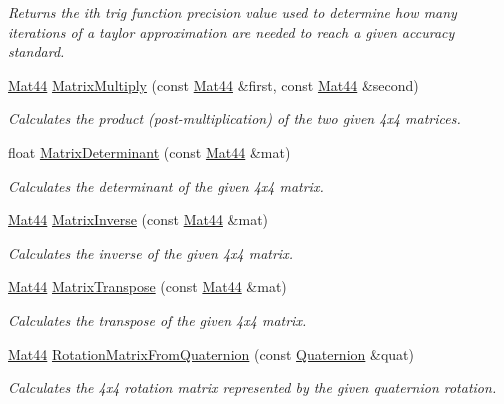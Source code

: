 \begin{DoxyCompactItemize}
\begin{DoxyCompactList}\small\item\em Returns the ith trig function precision value used to determine how many iterations of a taylor approximation are needed to reach a given accuracy standard. \end{DoxyCompactList}\item 
\hyperlink{classgofxmath_1_1_mat44}{Mat44} \hyperlink{namespacegofxmath_a4439d3f4590c372ada775196d1576f81}{Matrix\+Multiply} (const \hyperlink{classgofxmath_1_1_mat44}{Mat44} \&first, const \hyperlink{classgofxmath_1_1_mat44}{Mat44} \&second)
\begin{DoxyCompactList}\small\item\em Calculates the product (post-\/multiplication) of the two given 4x4 matrices. \end{DoxyCompactList}\item 
float \hyperlink{namespacegofxmath_a285829d964b38ad14730e85c325e775c}{Matrix\+Determinant} (const \hyperlink{classgofxmath_1_1_mat44}{Mat44} \&mat)
\begin{DoxyCompactList}\small\item\em Calculates the determinant of the given 4x4 matrix. \end{DoxyCompactList}\item 
\hyperlink{classgofxmath_1_1_mat44}{Mat44} \hyperlink{namespacegofxmath_a38c661c8ad19528520d36fabca7d555f}{Matrix\+Inverse} (const \hyperlink{classgofxmath_1_1_mat44}{Mat44} \&mat)
\begin{DoxyCompactList}\small\item\em Calculates the inverse of the given 4x4 matrix. \end{DoxyCompactList}\item 
\hyperlink{classgofxmath_1_1_mat44}{Mat44} \hyperlink{namespacegofxmath_a626e52b58fb763a90ba6e9d46966ee75}{Matrix\+Transpose} (const \hyperlink{classgofxmath_1_1_mat44}{Mat44} \&mat)
\begin{DoxyCompactList}\small\item\em Calculates the transpose of the given 4x4 matrix. \end{DoxyCompactList}\item 
\hyperlink{classgofxmath_1_1_mat44}{Mat44} \hyperlink{namespacegofxmath_ad7198c521a4d93e82694f39f0be736c9}{Rotation\+Matrix\+From\+Quaternion} (const \hyperlink{classgofxmath_1_1_quaternion}{Quaternion} \&quat)
\begin{DoxyCompactList}\small\item\em Calculates the 4x4 rotation matrix represented by the given quaternion rotation. \end{DoxyCompactList}\item 

\end{DoxyCompactItemize}
